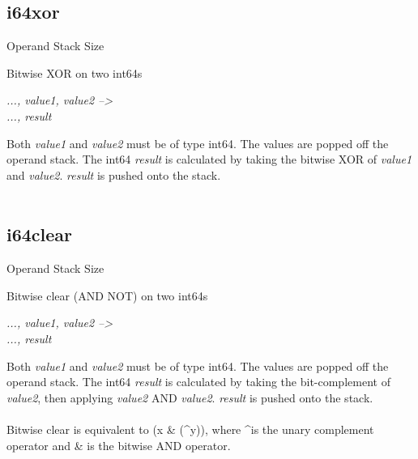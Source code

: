 \documentclass[12pt]{article}
\begin{document}
		\subsection*{i64xor}
			\begin{labeling}{Operand Stack Size}
				\item [\textbf{Operation}] Bitwise XOR on two int64s
				\item [\textbf{Format}] 
				\item [\textbf{Operand Stack}] \textit{..., value1, value2 --\textgreater } \\
										\textit{..., result}
				\item [\textbf{Description}] Both \textit{value1} and \textit{value2} must be of type int64. The values are popped off the operand stack. The int64 \textit{result} is calculated by taking the bitwise XOR of \textit{value1} and \textit{value2}. \textit{result} is pushed onto the stack. \\ \\
			\end{labeling}	
			
		\newpage
		\subsection*{i64clear}
			\begin{labeling}{Operand Stack Size}
				\item [\textbf{Operation}] Bitwise clear (AND NOT) on two int64s
				\item [\textbf{Format}] 
				\item [\textbf{Operand Stack}] \textit{..., value1, value2 --\textgreater } \\
										\textit{..., result}
				\item [\textbf{Description}] Both \textit{value1} and \textit{value2} must be of type int64. The values are popped off the operand stack. The int64 \textit{result} is calculated by taking the bit-complement of \textit{value2}, then applying \textit{value2} AND \textit{value2}. \textit{result} is pushed onto the stack. \\ \\
				Bitwise clear is equivalent to (x \& (\textasciicircum y)), where \textasciicircum is the unary complement operator and \& is the bitwise AND operator. 
			\end{labeling}
			
\end{document}
